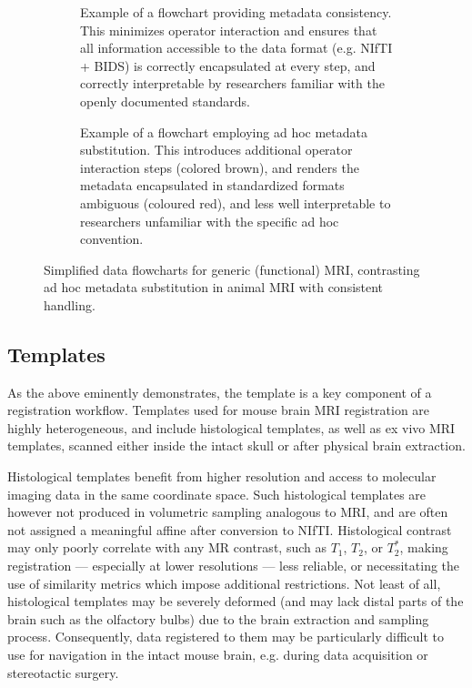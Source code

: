 \begin{figure*}[h!]
	\begin{subfigure}{\textwidth}
		\centering
		\vspace{-2.5em}
		\caption{
			Example of a flowchart providing metadata consistency. This minimizes operator interaction and ensures that all information accessible to the data format (e.g. NIfTI + BIDS) is correctly encapsulated at every step, and correctly interpretable by researchers familiar with the openly documented standards.
			}
		\label{fig:mdg}
	\end{subfigure}
	\begin{subfigure}{\textwidth}
		\centering
		\vspace{-2.5em}
		\caption{
			Example of a flowchart employing ad hoc metadata substitution. This introduces additional operator interaction steps (colored brown), and renders the metadata encapsulated in standardized formats ambiguous (coloured red), and less well interpretable to researchers unfamiliar with the specific ad hoc convention.
			}
		\label{fig:mdb}
	\end{subfigure}
	\caption{
		Simplified data flowcharts for generic (functional) MRI, contrasting ad hoc metadata substitution in animal MRI with consistent handling.
		}
	\label{fig:md}
\end{figure*}

\subsection{Templates}
As the above eminently demonstrates, the template is a key component of a registration workflow.
Templates used for mouse brain MRI registration are highly heterogeneous, and include histological templates, as well as ex vivo MRI templates, scanned either inside the intact skull or after physical brain extraction.

Histological templates benefit from higher resolution and access to molecular imaging data in the same coordinate space.
Such histological templates are however not produced in volumetric sampling analogous to MRI, and are often not assigned a meaningful affine after conversion to NIfTI.
Histological contrast may only poorly correlate with any MR contrast, such as $T_1$, $T_2$, or $T_2^*$, making registration --- especially at lower resolutions --- less reliable, or necessitating the use of similarity metrics which impose additional restrictions.
Not least of all, histological templates may be severely deformed (and may lack distal parts of the brain such as the olfactory bulbs) due to the brain extraction and sampling process.
Consequently, data registered to them may be particularly difficult to use for navigation in the intact mouse brain, e.g. during data acquisition or stereotactic surgery.

